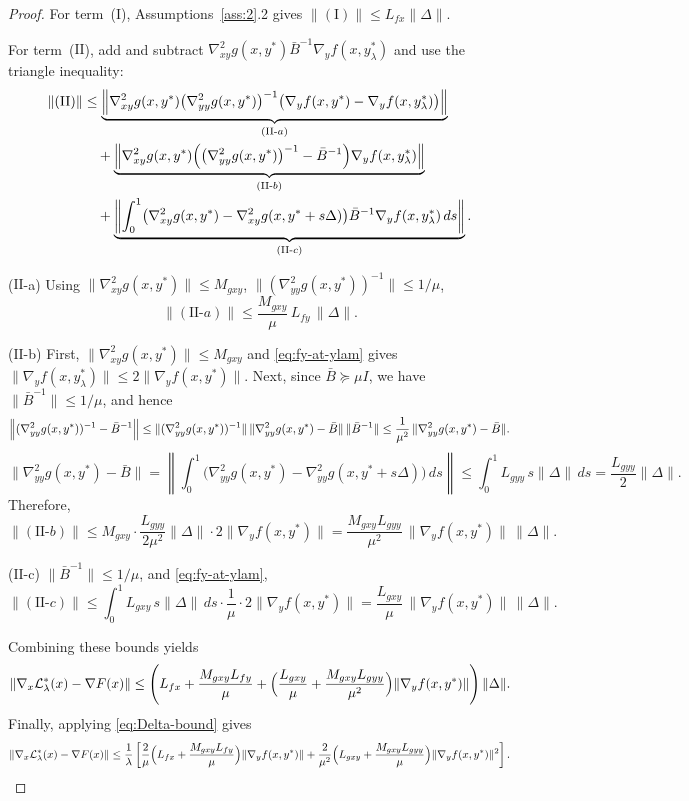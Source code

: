 \documentclass{article}
\newcommand{\1}{\mathbf{1}}
\begin{document}
\begin{proof}
For term~($\mathrm{I}$), Assumptions~\ref{ass:2}.2 gives $\|(\mathrm{I})\|\le L_{fx}\|\Delta\|$.

For term~($\mathrm{II}$), add and subtract
$\nabla_{xy}^{2}g(x,y^*)\bar B^{-1}\nabla_y f(x,y_\lambda^*)$ and use the triangle inequality:
\begin{align*}
\|(\mathrm{II})\|
&\le
\underbrace{\left\|
\nabla_{xy}^{2}g(x,y^*)\bigl(\nabla_{yy}^{2}g(x,y^*)\bigr)^{-1}
\bigl(\nabla_y f(x,y^*)-\nabla_y f(x,y_\lambda^*)\bigr)
\right\|}_{(\mathrm{II}\text{-}a)}\\
&\quad+
\underbrace{\left\|
\nabla_{xy}^{2}g(x,y^*)\Bigl(\bigl(\nabla_{yy}^{2}g(x,y^*)\bigr)^{-1}-\bar B^{-1}\Bigr)\nabla_y f(x,y_\lambda^*)
\right\|}_{(\mathrm{II}\text{-}b)}\\
&\quad+
\underbrace{\left\|
\int_{0}^{1}\bigl(\nabla_{xy}^{2}g(x,y^*)-\nabla_{xy}^{2}g(x,y^*+s\Delta)\bigr)\bar B^{-1}\nabla_y f(x,y_\lambda^*)\,ds
\right\|}_{(\mathrm{II}\text{-}c)}.
\end{align*}

($\mathrm{II}$-a) Using $\|\nabla_{xy}^{2}g(x,y^*)\|\le M_{gxy}$, $\|(\nabla_{yy}^{2}g(x,y^*))^{-1}\|\le 1/\mu$,
\[
\|(\mathrm{II}\text{-}a)\|
\le
\frac{M_{gxy}}{\mu}\,L_{fy}\,\|\Delta\|.
\]

($\mathrm{II}$-b)  First, $\|\nabla_{xy}^{2}g(x,y^*)\|\le M_{gxy}$ and \eqref{eq:fy-at-ylam} gives
$\|\nabla_y f(x,y_\lambda^*)\|\le 2\|\nabla_y f(x,y^*)\|$.
Next, since $\bar B\succeq \mu I$, we have $\|\bar B^{-1}\|\le 1/\mu$, and hence
\[
\Bigl\|(\nabla_{yy}^{2}g(x,y^*))^{-1}-\bar B^{-1}\Bigr\|
\le
\|(\nabla_{yy}^{2}g(x,y^*))^{-1}\|\,\|\nabla_{yy}^{2}g(x,y^*)-\bar B\|\,\|\bar B^{-1}\|
\le
\frac{1}{\mu^2}\,\|\nabla_{yy}^{2}g(x,y^*)-\bar B\|.
\]
\[
\|\nabla_{yy}^{2}g(x,y^*)-\bar B\|
=
\left\|\int_{0}^{1}\bigl(\nabla_{yy}^{2}g(x,y^*)-\nabla_{yy}^{2}g(x,y^*+s\Delta)\bigr)\,ds\right\|
\le
\int_{0}^{1} L_{gyy}\,s\|\Delta\|\,ds
=
\frac{L_{gyy}}{2}\|\Delta\|.
\]
Therefore,
\[
\|(\mathrm{II}\text{-}b)\|
\le
M_{gxy}\cdot \frac{L_{gyy}}{2\mu^2}\|\Delta\|\cdot 2\|\nabla_y f(x,y^*)\|
=
\frac{M_{gxy}L_{gyy}}{\mu^2}\,\|\nabla_y f(x,y^*)\|\,\|\Delta\|.
\]

($\mathrm{II}$-c) $\|\bar B^{-1}\|\le 1/\mu$, and \eqref{eq:fy-at-ylam},
\[
\|(\mathrm{II}\text{-}c)\|
\le
\int_{0}^{1} L_{gxy}\,s\|\Delta\|\,ds\cdot \frac{1}{\mu}\cdot 2\|\nabla_y f(x,y^*)\|
=
\frac{L_{gxy}}{\mu}\,\|\nabla_y f(x,y^*)\|\,\|\Delta\|.
\]

Combining these bounds yields
\[
\|\nabla_x \mathcal L_\lambda^{*}(x)-\nabla F(x)\|
\le
\Biggl(
L_{fx}
+\frac{M_{gxy}L_{fy}}{\mu}
+\Bigl(\frac{L_{gxy}}{\mu}+\frac{M_{gxy}L_{gyy}}{\mu^2}\Bigr)\|\nabla_y f(x,y^*)\|
\Biggr)\,\|\Delta\|.
\]
Finally, applying \eqref{eq:Delta-bound} gives
\[
\|\nabla_x \mathcal L_\lambda^{*}(x)-\nabla F(x)\|
\le
\frac{1}{\lambda}\left[
\frac{2}{\mu}\Bigl(L_{fx}+\frac{M_{gxy}L_{fy}}{\mu}\Bigr)\|\nabla_y f(x,y^*)\|
+\frac{2}{\mu^2}\Bigl(L_{gxy}+\frac{M_{gxy}L_{gyy}}{\mu}\Bigr)\|\nabla_y f(x,y^*)\|^2
\right].
\]
\end{proof} 
\end{document}
